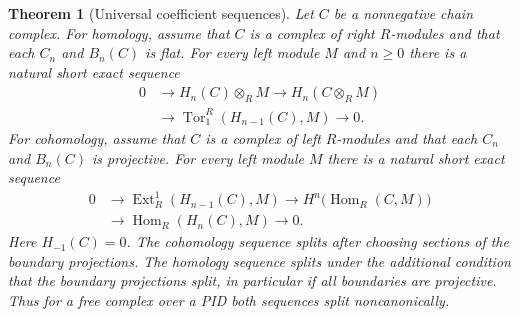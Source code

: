 \documentclass[11pt,oneside,openany]{book}
\newtheorem{theorem}{Theorem}[chapter]
\theoremstyle{definition}
\theoremstyle{remark}
\begin{document}
\begin{theorem}[Universal coefficient sequences]
\label{p103:ALG-10-C03-R03}
Let \(C\) be a nonnegative chain complex.
For homology, assume that \(C\) is a complex of right \(R\)-modules
and that each \(C_n\) and \(B_n(C)\) is flat. For every left module \(M\)
and \(n\geq0\) there is a natural short exact sequence
\[
 \begin{split}
 0&\longrightarrow H_n(C)\otimes_R M
 \longrightarrow H_n(C\otimes_R M)\\
 &\longrightarrow\operatorname{Tor}_1^R(H_{n-1}(C),M)
 \longrightarrow0 .
 \end{split}
\]
For cohomology, assume that \(C\) is a complex of left \(R\)-modules
and that each \(C_n\) and \(B_n(C)\) is projective.
For every left module \(M\) there is a natural short exact sequence
\[
 \begin{split}
 0&\longrightarrow\operatorname{Ext}_R^1(H_{n-1}(C),M)
 \longrightarrow H^n\!\bigl(\operatorname{Hom}_R(C,M)\bigr)\\
 &\longrightarrow\operatorname{Hom}_R(H_n(C),M)
 \longrightarrow0 .
 \end{split}
\]
Here \(H_{-1}(C)=0\). The cohomology sequence splits after
choosing sections of the boundary projections. The homology
sequence splits under the additional condition that the boundary
projections split, in particular if all boundaries are projective.
Thus for a free complex over a PID both sequences split
noncanonically.
\end{theorem}
\end{document}
